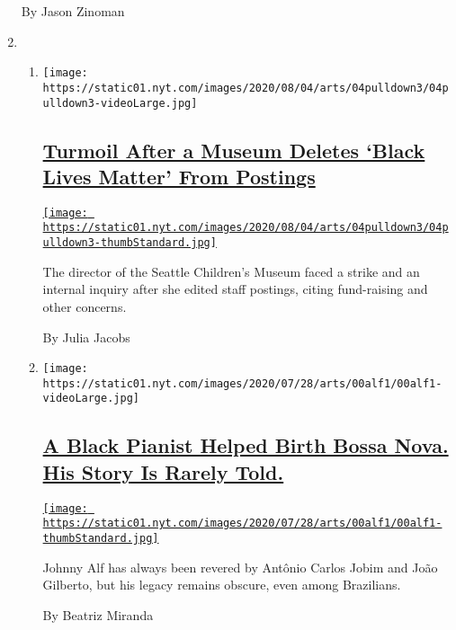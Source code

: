 \begin{enumerate}
  By Jason Zinoman
\item
  \begin{enumerate}
  \def\labelenumii{\arabic{enumii}.}
  \item
    \texttt{[image: https://static01.nyt.com/images/2020/08/04/arts/04pulldown3/04pulldown3-videoLarge.jpg]}

    \hypertarget{turmoil-after-a-museum-deletes-black-lives-matter-from-postings}{%
    \subsection{\texorpdfstring{\href{/2020/08/04/arts/design/seattle-childrens-museum.html}{Turmoil
    After a Museum Deletes `Black Lives Matter' From
    Postings}}{Turmoil After a Museum Deletes `Black Lives Matter' From Postings}}\label{turmoil-after-a-museum-deletes-black-lives-matter-from-postings}}

    \href{/2020/08/04/arts/design/seattle-childrens-museum.html}{\texttt{[image: https://static01.nyt.com/images/2020/08/04/arts/04pulldown3/04pulldown3-thumbStandard.jpg]}}

    The director of the Seattle Children's Museum faced a strike and an
    internal inquiry after she edited staff postings, citing
    fund-raising and other concerns.

    By Julia Jacobs
  \item
    \texttt{[image: https://static01.nyt.com/images/2020/07/28/arts/00alf1/00alf1-videoLarge.jpg]}

    \hypertarget{a-black-pianist-helped-birth-bossa-nova-his-story-is-rarely-told}{%
    \subsection{\texorpdfstring{\href{/2020/08/04/arts/music/johnny-alf-bossa-nova.html}{A
    Black Pianist Helped Birth Bossa Nova. His Story Is Rarely
    Told.}}{A Black Pianist Helped Birth Bossa Nova. His Story Is Rarely Told.}}\label{a-black-pianist-helped-birth-bossa-nova-his-story-is-rarely-told}}

    \href{/2020/08/04/arts/music/johnny-alf-bossa-nova.html}{\texttt{[image: https://static01.nyt.com/images/2020/07/28/arts/00alf1/00alf1-thumbStandard.jpg]}}

    Johnny Alf has always been revered by Antônio Carlos Jobim and João
    Gilberto, but his legacy remains obscure, even among Brazilians.

    By Beatriz Miranda
  \end{enumerate}
\end{enumerate}

